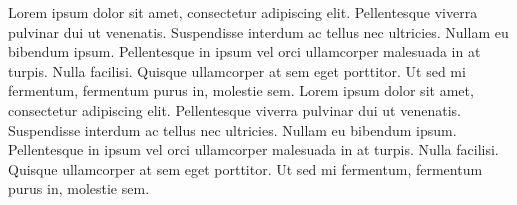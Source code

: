 \documentclass[../main.tex]{subfiles}
\begin{document}
Lorem ipsum dolor sit amet, consectetur adipiscing elit. Pellentesque viverra pulvinar dui ut venenatis.
Suspendisse interdum ac tellus nec ultricies. Nullam eu bibendum ipsum. Pellentesque in ipsum vel orci 
ullamcorper malesuada in at turpis. Nulla facilisi. Quisque ullamcorper at sem eget porttitor. Ut sed mi fermentum, 
fermentum purus in, molestie sem.
Lorem ipsum dolor sit amet, consectetur adipiscing elit. Pellentesque viverra pulvinar dui ut venenatis.
Suspendisse interdum ac tellus nec ultricies. Nullam eu bibendum ipsum. Pellentesque in ipsum vel orci 
ullamcorper malesuada in at turpis. Nulla facilisi. Quisque ullamcorper at sem eget porttitor. Ut sed mi fermentum, 
fermentum purus in, molestie sem.

	\vspace{10pt}
\end{document}
